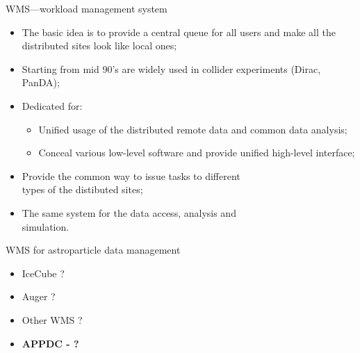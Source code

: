 \begin{frame}{WMS---workload management system}
\begin{itemize}
  \item The basic idea is to provide a central queue for all users and make all the distributed sites look like local ones;
  \item Starting from mid 90's are widely used in collider experiments (Dirac, PanDA);
  \item Dedicated for:
  \begin{itemize}
  \item Unified usage of the distributed remote data and common data analysis;
  \item Conceal various low-level software and provide unified high-level interface;
  \end{itemize}
  \item Provide the common way to issue tasks to different\\types of the distibuted sites;
  \item
  The same system for the data access, analysis and\\simulation.
\end{itemize}
\end{frame}

\begin{frame}{WMS for astroparticle data management}
\begin{itemize}
 \item <2->IceCube ? 
 \item <4-> Auger ? 
 \item <6-> Other WMS ? 
 \vspace{2em}
 \item <8-> \textbf{\textcolor{kit-green100}{APPDC - ?}}
\end{itemize}



\end{frame}

